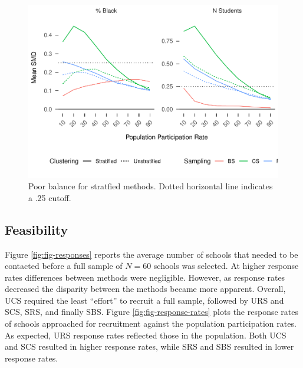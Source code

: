 \documentclass[man,floatsintext]{apa6}
\begin{document}
\begin{figure}
\centering
\includegraphics{GenSamp-Paper_files/figure-latex/fig-SMD-by-Var-bad-1.pdf}
\caption{\label{fig:fig-SMD-by-Var-bad}Poor balance for stratfied methods. Dotted horizontal line indicates a .25 cutoff.}
\end{figure}

\hypertarget{feasibility-1}{%
\subsection{Feasibility}\label{feasibility-1}}

Figure \ref{fig:fig-responses} reports the average number of schools that needed to be contacted before a full sample of \(N = 60\) schools was selected. At higher response rates differences between methods were negligible. However, as response rates decreased the disparity between the methods became more apparent. Overall, UCS required the least \enquote{effort} to recruit a full sample, followed by URS and SCS, SRS, and finally SBS. Figure \ref{fig:fig-response-rates} plots the response rates of schools approached for recruitment against the population participation rates. As expected, URS response rates reflected those in the population. Both UCS and SCS resulted in higher response rates, while SRS and SBS resulted in lower response rates.
\end{document}
